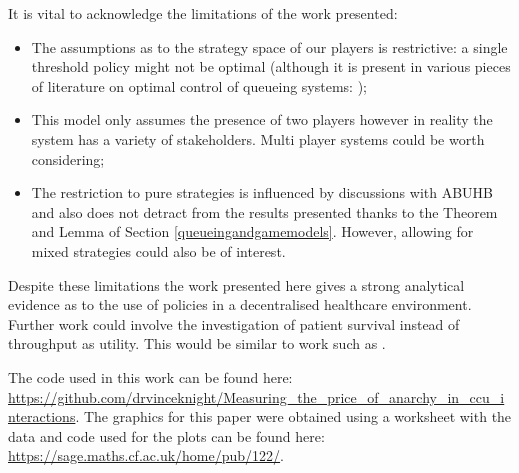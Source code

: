 \documentclass{article}
\begin{document}
It is vital to acknowledge the limitations of the work presented:

\begin{itemize}
    \item The assumptions as to the strategy space of our players is restrictive: a single threshold policy might not be optimal (although it is present in various pieces of literature on optimal control of queueing systems: \cite{naor1969regulation, shone2013comparisons});
    \item This model only assumes the presence of two players however in reality the system has a variety of stakeholders. Multi player systems could be worth considering;
    \item The restriction to pure strategies is influenced by discussions with ABUHB and also does not detract from the results presented thanks to the Theorem and Lemma of Section \ref{queueingandgamemodels}.  However, allowing for mixed strategies could also be of interest.
\end{itemize}

Despite these limitations the work presented here gives a strong analytical evidence as to the use of policies in a decentralised healthcare environment.
Further work could involve the investigation of patient survival instead of throughput as utility.
This would be similar to work such as \cite{erkut2008ambulance, knight2012ambulance}.

The code used in this work can be found here: \url{https://github.com/drvinceknight/Measuring_the_price_of_anarchy_in_ccu_interactions}.
The graphics for this paper were obtained using \cite{Hunter:2007, sage} a worksheet with the data and code used for the plots can be found here: \url{https://sage.maths.cf.ac.uk/home/pub/122/}.

\newpage


\end{document}
